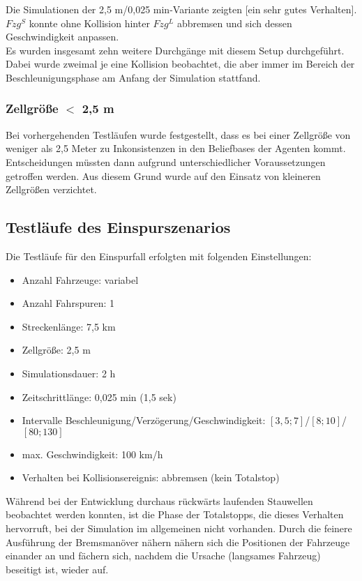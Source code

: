Die Simulationen der 2,5 m/0,025 min-Variante zeigten [ein sehr gutes Verhalten].
$Fzg^{S}$ konnte ohne Kollision hinter $Fzg^{L}$ abbremsen und sich dessen Geschwindigkeit anpassen.
\\
Es wurden insgesamt zehn weitere Durchgänge mit diesem Setup durchgeführt. 
Dabei wurde zweimal je eine Kollision beobachtet, die aber immer im Bereich der Beschleunigungsphase am Anfang der Simulation stattfand. 

\subsubsection{\texorpdfstring{Zellgröße $ < $ 2,5 m}%
                              {Zellgröße kleiner als 2,5 m}}

Bei vorhergehenden Testläufen wurde festgestellt, dass es bei einer Zellgröße von weniger als 2,5 Meter zu Inkonsistenzen in den Beliefbases der Agenten kommt.
Entscheidungen müssten dann aufgrund unterschiedlicher Voraussetzungen getroffen werden.
Aus diesem Grund wurde auf den Einsatz von kleineren Zellgrößen verzichtet.





\subsection{Testläufe des Einspurszenarios}
\label{test-singlelane}

Die Testläufe für den Einspurfall erfolgten mit folgenden Einstellungen:
\begin{itemize}
	\itemsep0em
	\item Anzahl Fahrzeuge: variabel
	\item Anzahl Fahrspuren: 1
	\item Streckenlänge: 7,5 km 
	\item Zellgröße: 2,5 m
	\item Simulationsdauer: 2 h
	\item Zeitschrittlänge: 0,025 min (1,5 sek)
	\item Intervalle Beschleunigung/Verzögerung/Geschwindigkeit: $ [3,5; 7] $/$ [8; 10] $/$ [80; 130] $
	\item max. Geschwindigkeit: 100 km/h
	\item Verhalten bei Kollisionsereignis: abbremsen (kein Totalstop)
\end{itemize}

Während bei der Entwicklung durchaus rückwärts laufenden Stauwellen beobachtet werden konnten, ist die Phase der Totalstopps, die dieses Verhalten hervorruft, bei der Simulation im allgemeinen nicht vorhanden.
Durch die feinere Ausführung der Bremsmanöver nähern nähern sich die Positionen der Fahrzeuge einander an und fächern sich, nachdem die Ursache (langsames Fahrzeug) beseitigt ist, wieder auf.















